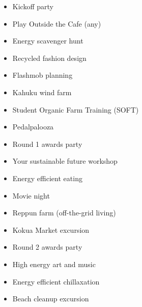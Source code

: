 \begin{itemize}
	\item Kickoff party
	\item Play Outside the Cafe (any)
	\item Energy scavenger hunt
	\item Recycled fashion design
	\item Flashmob planning
	\item Kahuku wind farm
	\item Student Organic Farm Training (SOFT)
	\item Pedalpalooza
	\item Round 1 awards party
	\item Your sustainable future workshop
	\item Energy efficient eating
	\item Movie night
	\item Reppun farm (off-the-grid living)
	\item Kokua Market excursion
	\item Round 2 awards party
	\item High energy art and music
	\item Energy efficient chillaxation
	\item Beach cleanup excursion
\end{itemize}

